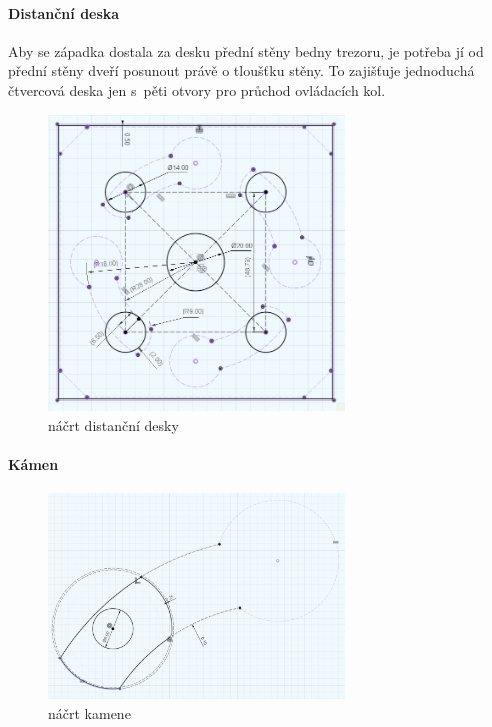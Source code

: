 \paragraph{Distanční deska}

Aby se západka dostala za desku přední stěny bedny trezoru, je potřeba jí od přední stěny dveří posunout právě o tloušťku stěny. To zajišťuje jednoduchá čtvercová deska jen s~pěti otvory
pro průchod ovládacích kol.


\begin{figure}
	\centering
    \includegraphics[width=0.7\textwidth]{kapitoly/obrazky/M3/distancka.png}
    \caption{náčrt distanční desky}
    \label{fig:M3-distancka}
\end{figure}


\paragraph{Kámen} %
\begin{figure}
	\centering
    \includegraphics[width=0.7\textwidth]{kapitoly/obrazky/M3/kamen.png}
    \caption{náčrt kamene}
    \label{fig:M3-kamen}
\end{figure}

